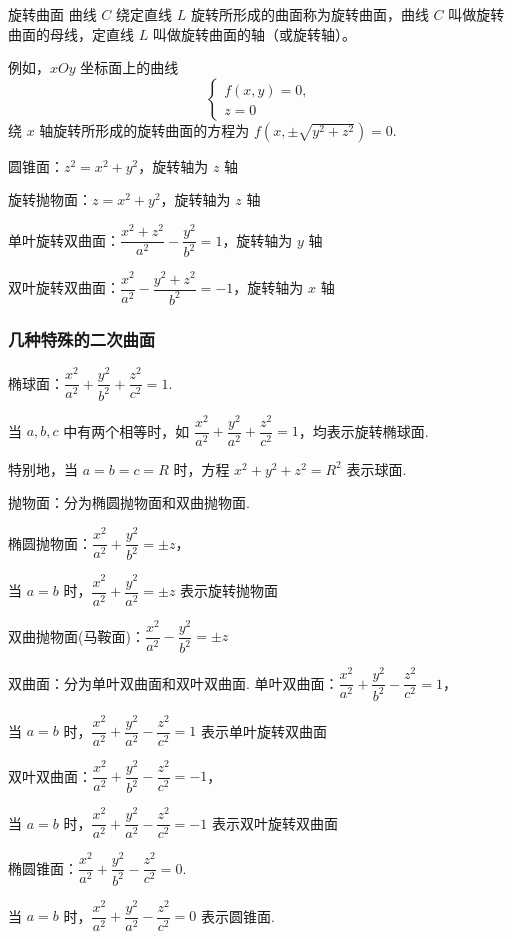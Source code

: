 \begin{dy}{旋转曲面}{}
曲线 $C$ 绕定直线 $L$ 旋转所形成的曲面称为旋转曲面，曲线 $C$ 叫做旋转曲面的母线，定直线 $L$ 叫做旋转曲面的轴（或旋转轴）。

例如，$xOy$ 坐标面上的曲线
\[
\begin{cases}
f(x,y)=0, \\
z=0
\end{cases}
\]
绕 $x$ 轴旋转所形成的旋转曲面的方程为 $f(x,\pm\sqrt{y^2+z^2})=0$.
\end{dy}
    \begin{zs}
        圆锥面：$z^2=x^2+y^2$，旋转轴为 $z$ 轴

 旋转抛物面：$z=x^2+y^2$，旋转轴为 $z$ 轴

单叶旋转双曲面：$\dfrac{x^2+z^2}{a^2}-\dfrac{y^2}{b^2}=1$，旋转轴为 $y$ 轴

双叶旋转双曲面：$\dfrac{x^2}{a^2}-\dfrac{y^2+z^2}{b^2}=-1$，旋转轴为 $x$ 轴
    \end{zs}
\subsubsection*{ 几种特殊的二次曲面}
\begin{zs}
    椭球面：$\dfrac{x^2}{a^2}+\dfrac{y^2}{b^2}+\dfrac{z^2}{c^2}=1$.

当 $a,b,c$ 中有两个相等时，如 $\dfrac{x^2}{a^2}+\dfrac{y^2}{a^2}+\dfrac{z^2}{c^2}=1$，均表示旋转椭球面.

特别地，当 $a=b=c=R$ 时，方程 $x^2+y^2+z^2=R^2$ 表示球面.
\end{zs}
\begin{zs}
    抛物面：分为椭圆抛物面和双曲抛物面.

椭圆抛物面：$\dfrac{x^2}{a^2}+\dfrac{y^2}{b^2}=\pm z$，

当 $a=b$ 时，$\dfrac{x^2}{a^2}+\dfrac{y^2}{a^2}=\pm z$ 表示旋转抛物面

双曲抛物面(马鞍面)：$\dfrac{x^2}{a^2}-\dfrac{y^2}{b^2}=\pm z$
\end{zs}
\begin{zs}
    双曲面：分为单叶双曲面和双叶双曲面.
单叶双曲面：$\dfrac{x^2}{a^2}+\dfrac{y^2}{b^2}-\dfrac{z^2}{c^2}=1$，

当 $a=b$ 时，$\dfrac{x^2}{a^2}+\dfrac{y^2}{a^2}-\dfrac{z^2}{c^2}=1$ 表示单叶旋转双曲面

双叶双曲面：$\dfrac{x^2}{a^2}+\dfrac{y^2}{b^2}-\dfrac{z^2}{c^2}=-1$，

当 $a=b$ 时，$\dfrac{x^2}{a^2}+\dfrac{y^2}{a^2}-\dfrac{z^2}{c^2}=-1$ 表示双叶旋转双曲面
\end{zs}
\begin{zs}
    椭圆锥面：$\dfrac{x^2}{a^2}+\dfrac{y^2}{b^2}-\dfrac{z^2}{c^2}=0$. 

当 $a=b$ 时，$\dfrac{x^2}{a^2}+\dfrac{y^2}{a^2}-\dfrac{z^2}{c^2}=0$ 表示圆锥面.
\end{zs}
